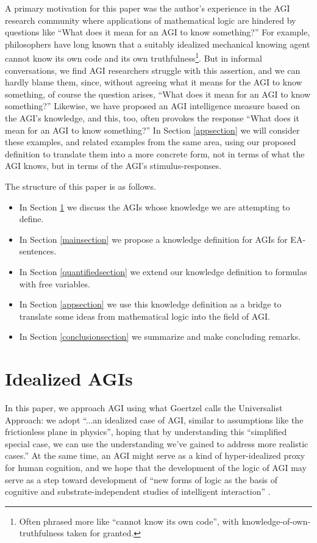\documentclass[runningheads]{llncs}
\begin{document}
A primary motivation for this
paper was the author's experience in the AGI research community where applications
of mathematical logic are hindered by questions like ``What does it mean
for an AGI to know something?'' For example, philosophers
have long known that a suitably idealized mechanical
knowing agent cannot know its own code and its own truthfulness\footnote{Often
phrased more like ``cannot know its own code'', with knowledge-of-own-truthfulness
taken for granted.}.
But in informal conversations, we find
AGI researchers struggle with this assertion, and we can hardly blame
them, since, without agreeing what it means for the AGI to know something,
of course the question arises, ``What does it mean for
an AGI to know something?'' Likewise, we have proposed \cite{ioi2} an AGI
intelligence measure based on the AGI's knowledge, and this, too, often
provokes the response ``What does it mean for an AGI to know something?''
In Section \ref{appsection} we will consider these examples, and related
examples from the same area, using our proposed definition to translate
them into a more concrete form, not in terms of what the AGI knows, but
in terms of the AGI's stimulus-responses.


The structure of this paper is as follows.
\begin{itemize}
  \item In Section \ref{agisection} we discuss the AGIs whose knowledge we are
  attempting to define.
  \item In Section \ref{mainsection} we propose a knowledge definition for
  AGIs for EA-sentences.
  \item In Section \ref{quantifiedsection} we extend our knowledge definition
  to formulas with free variables.
  \item In Section \ref{appsection} we use this knowledge definition as a bridge
  to translate some ideas from mathematical logic into the field of AGI.
  \item In Section \ref{conclusionsection} we summarize and make concluding remarks.
\end{itemize}

\section{Idealized AGIs}
\label{agisection}

In this paper, we approach AGI using what
Goertzel \cite{goertzel2014artificial} calls
the Universalist Approach:
we adopt ``...an idealized case of AGI, similar to
assumptions like the frictionless plane in physics'', hoping that by
understanding this ``simplified special
case, we can use the understanding we've gained to address more realistic
cases.'' At the same time, an AGI might serve as a kind of hyper-idealized
proxy for human cognition, and we hope that the development of the logic
of AGI may serve as a step toward development of ``new forms of logic as
the basis of cognitive and substrate-independent studies of intelligent interaction''
\cite{cerone2019interdisciplinary}.
\end{document}

